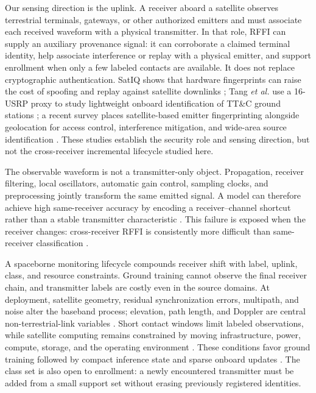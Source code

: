 \documentclass[journal]{IEEEtran}
\begin{document}
Our sensing direction is the uplink. A receiver aboard a satellite observes terrestrial terminals, gateways, or other authorized emitters and must associate each received waveform with a physical transmitter. In that role, RFFI can supply an auxiliary provenance signal: it can corroborate a claimed terminal identity, help associate interference or replay with a physical emitter, and support enrollment when only a few labeled contacts are available. It does not replace cryptographic authentication. SatIQ shows that hardware fingerprints can raise the cost of spoofing and replay against satellite downlinks \cite{smailes2023satiq}; Tang \emph{et al.} use a 16-USRP proxy to study lightweight onboard identification of TT\&C ground stations \cite{tang2023ttc}; a recent survey places satellite-based emitter fingerprinting alongside geolocation for access control, interference mitigation, and wide-area source identification \cite{hendy2026beyondgnss}. These studies establish the security role and sensing direction, but not the cross-receiver incremental lifecycle studied here.

The observable waveform is not a transmitter-only object. Propagation, receiver filtering, local oscillators, automatic gain control, sampling clocks, and preprocessing jointly transform the same emitted signal. A model can therefore achieve high same-receiver accuracy by encoding a receiver--channel shortcut rather than a stable transmitter characteristic \cite{restuccia2019deepradioid,alshawabka2020exposing}. This failure is exposed when the receiver changes: cross-receiver RFFI is consistently more difficult than same-receiver classification \cite{hanna2022wisig,shen2024receiveragnostic,zhang2024riei}.

A spaceborne monitoring lifecycle compounds receiver shift with label, uplink, class, and resource constraints. Ground training cannot observe the final receiver chain, and transmitter labels are costly even in the source domains. At deployment, satellite geometry, residual synchronization errors, multipath, and noise alter the baseband process; elevation, path length, and Doppler are central non-terrestrial-link variables \cite{3gpp38811}. Short contact windows limit labeled observations, while satellite computing remains constrained by moving infrastructure, power, compute, storage, and the operating environment \cite{wang2023satellitecomputing}. These conditions favor ground training followed by compact inference state and sparse onboard updates \cite{zhao2026gsgl}. The class set is also open to enrollment: a newly encountered transmitter must be added from a small support set without erasing previously registered identities.
\end{document}
